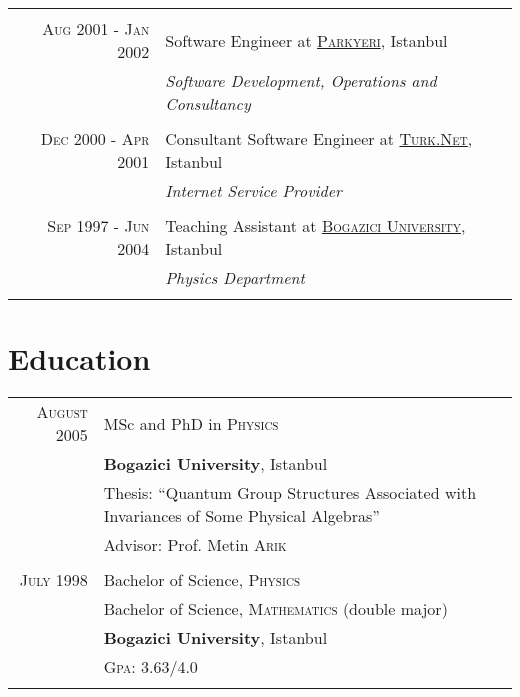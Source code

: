 \documentclass[a4paper,10pt]{article}
\begin{document}
\begin{tabular}{r|p{11cm}}
  \multicolumn{2}{c}{} \\

  \textsc{Aug 2001 - Jan 2002}  & Software Engineer at \href{http://www.parkyeri.com}{\textsc{Parkyeri}}, Istanbul \\
                                & \emph{Software Development, Operations and Consultancy} \\

  \multicolumn{2}{c}{} \\

  \textsc{Dec 2000 - Apr 2001}  & Consultant Software Engineer at \href{http://turk.net/}{\textsc{Turk.Net}}, Istanbul \\
                                & \emph{Internet Service Provider} \\

  \multicolumn{2}{c}{} \\

  \textsc{Sep 1997 - Jun 2004}  & Teaching Assistant at \href{http://www.boun.edu.tr/}{\textsc{Bogazici University}}, Istanbul \\
                                & \emph{Physics Department} \\

  \multicolumn{2}{c}{} \\

\end{tabular}

\section{Education}
\begin{longtable}{r|p{11cm}}
  \textsc{August} 2005  & MSc and PhD in \textsc{Physics} \\
                        & \textbf{Bogazici University}, Istanbul\\
                        & Thesis: ``Quantum Group Structures Associated with Invariances of Some Physical Algebras'' \\
                        & \small Advisor: Prof. Metin \textsc{Arik}\\
  \multicolumn{2}{c}{} \\

  \textsc{July} 1998    & Bachelor of Science, \textsc{Physics} \\
                        & Bachelor of Science, \textsc{Mathematics} (double major) \\
                        & \normalsize\textbf{Bogazici University}, Istanbul \\
                        & \normalsize \textsc{Gpa}: 3.63/4.0 \\
  \multicolumn{2}{c}{} \\

\end{longtable}
\end{document}
